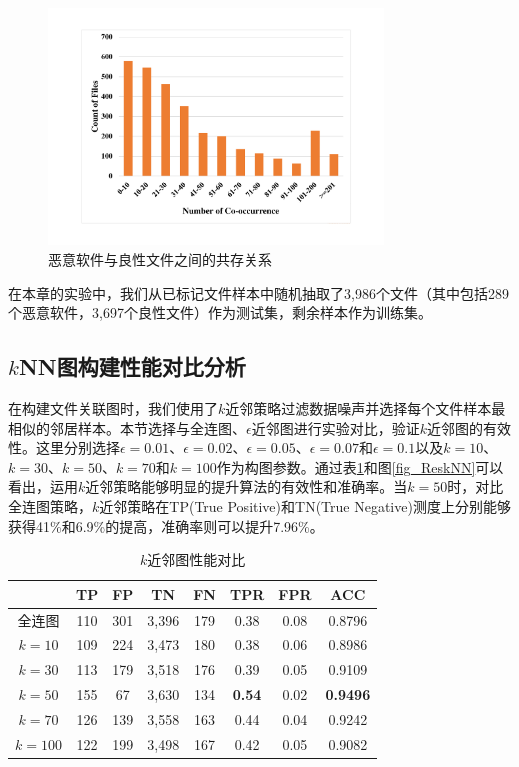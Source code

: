 \begin{figure}[!ht]
\centering
\includegraphics[width=3.5in]{img/chap2/MalRefCountWht.pdf}
\caption{恶意软件与良性文件之间的共存关系}
\label{fig_MalRefWht}
\end{figure}
在本章的实验中，我们从已标记文件样本中随机抽取了3,986个文件（其中包括289个恶意软件，3,697个良性文件）作为测试集，剩余样本作为训练集。

\subsection{$k$NN图构建性能对比分析}
在构建文件关联图时，我们使用了$k$近邻策略过滤数据噪声并选择每个文件样本最相似的邻居样本。本节选择与全连图、$\epsilon$近邻图进行实验对比，验证$k$近邻图的有效性。这里分别选择$\epsilon=0.01$、$\epsilon=0.02$、$\epsilon=0.05$、$\epsilon=0.07$和$\epsilon=0.1$以及$k=10$、$k=30$、$k=50$、$k=70$和$k=100$作为构图参数。通过表\ref{tb_ResKNN}和图\ref{fig_ReskNN}可以看出，运用$k$近邻策略能够明显的提升算法的有效性和准确率。当$k=50$时，对比全连图策略，$k$近邻策略在TP(True Positive)和TN(True Negative)测度上分别能够获得41\%和6.9\%的提高，准确率则可以提升7.96\%。

\begin{table}[!ht]
\renewcommand{\arraystretch}{1.5}
\caption{$k$近邻图性能对比}
\label{tb_ResKNN}
\centering
\begin{tabular}{cccccccc}

\toprule
 & TP & FP & TN & FN & TPR & FPR & ACC\\
\midrule
全连图 & 110 & 301 & 3,396 & 179 & 0.38 & 0.08 & 0.8796 \\
$k=10$ & 109 & 224 & 3,473 & 180 & 0.38 & 0.06 & 0.8986 \\
$k=30$ & 113 & 179 & 3,518 & 176 & 0.39 & 0.05 & 0.9109 \\
$k=50$ & 155 & 67 & 3,630 & 134 & \textbf{0.54} & 0.02 & \textbf{0.9496}\\
$k=70$ & 126 & 139 & 3,558 & 163 & 0.44 & 0.04 & 0.9242 \\
$k=100$ & 122 & 199 & 3,498 & 167 & 0.42 & 0.05 & 0.9082 \\
\bottomrule
\end{tabular}
\end{table}

